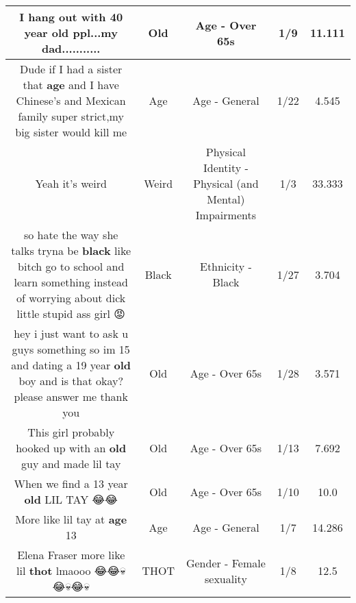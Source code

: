 \documentclass[11pt]{article}
\newlength\mylength
\begin{document}
\begin{center}
\begin{longtable}{|C{.65\mylength}|C{.30\mylength}|C{.12\mylength}|C{.12\mylength}|C{.12\mylength}|}
  \small I hang out with 40 year \textbf{old} ppl...my dad...........\normalsize   & Old & Age - Over 65s & 1/9 & 11.111 \\  \hline
  \small Dude if I had a sister that \textbf{age} and I have Chinese's and Mexican family super strict,my big sister would kill me\normalsize   & Age & Age - General & 1/22 & 4.545 \\  \hline
  \small Yeah it's weird\normalsize   & Weird & Physical Identity - Physical (and Mental) Impairments & 1/3 & 33.333 \\  \hline
  \small so hate the way she talks tryna be \textbf{black} like bitch go to school and learn something instead of worrying about dick little stupid ass girl 😡\normalsize   & Black & Ethnicity - Black & 1/27 & 3.704 \\  \hline
  \small hey i just want to ask u guys something so im 15 and dating a 19 year \textbf{old} boy and is that okay? please answer me thank you\normalsize   & Old & Age - Over 65s & 1/28 & 3.571 \\  \hline
  \small This girl probably hooked up with an \textbf{old} guy and made lil tay\normalsize   & Old & Age - Over 65s & 1/13 & 7.692 \\  \hline
  \small When we find a 13 year \textbf{old} LIL TAY 😂😂\normalsize   & Old & Age - Over 65s & 1/10 & 10.0 \\  \hline
  \small More like lil tay at \textbf{age} 13\normalsize   & Age & Age - General & 1/7 & 14.286 \\  \hline
  \small Elena Fraser more like lil \textbf{thot} lmaooo 😂😂💀😂💀😂💀\normalsize   & THOT & Gender - Female sexuality & 1/8 & 12.5 \\  \hline

\end{longtable}
\end{center}
\end{document}
